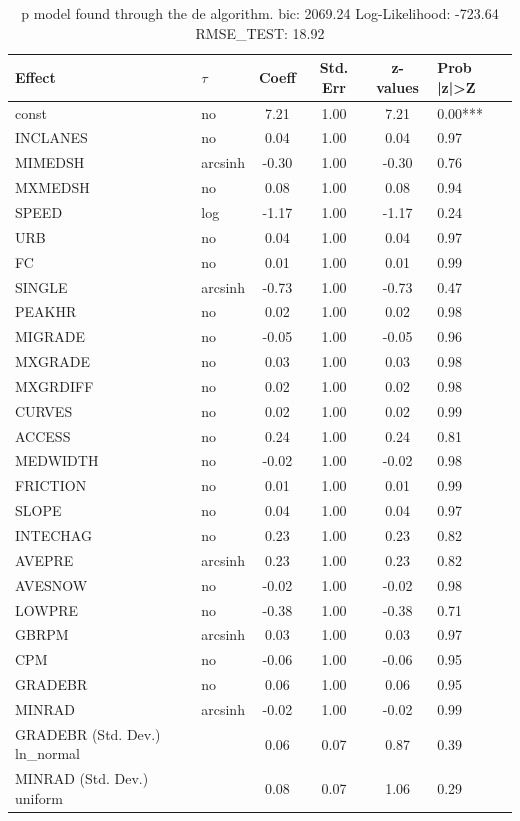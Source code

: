 \begin{table}
	\caption{p model found through the de algorithm. bic: 2069.24 Log-Likelihood: -723.64 RMSE_TEST: 18.92}
	\begin{center}
		\begin{tabular}{|l|l|c|c|c|l|}
			\hline
			Effect & $\tau$ & Coeff & Std. Err & z-values & Prob |z|>Z \\
			\hline
			const & no & 7.21 & 1.00 & 7.21 & 0.00*** \\
			\hline
			INCLANES & no & 0.04 & 1.00 & 0.04 & 0.97 \\
			\hline
			MIMEDSH & arcsinh & -0.30 & 1.00 & -0.30 & 0.76 \\
			\hline
			MXMEDSH & no & 0.08 & 1.00 & 0.08 & 0.94 \\
			\hline
			SPEED & log & -1.17 & 1.00 & -1.17 & 0.24 \\
			\hline
			URB & no & 0.04 & 1.00 & 0.04 & 0.97 \\
			\hline
			FC & no & 0.01 & 1.00 & 0.01 & 0.99 \\
			\hline
			SINGLE & arcsinh & -0.73 & 1.00 & -0.73 & 0.47 \\
			\hline
			PEAKHR & no & 0.02 & 1.00 & 0.02 & 0.98 \\
			\hline
			MIGRADE & no & -0.05 & 1.00 & -0.05 & 0.96 \\
			\hline
			MXGRADE & no & 0.03 & 1.00 & 0.03 & 0.98 \\
			\hline
			MXGRDIFF & no & 0.02 & 1.00 & 0.02 & 0.98 \\
			\hline
			CURVES & no & 0.02 & 1.00 & 0.02 & 0.99 \\
			\hline
			ACCESS & no & 0.24 & 1.00 & 0.24 & 0.81 \\
			\hline
			MEDWIDTH & no & -0.02 & 1.00 & -0.02 & 0.98 \\
			\hline
			FRICTION & no & 0.01 & 1.00 & 0.01 & 0.99 \\
			\hline
			SLOPE & no & 0.04 & 1.00 & 0.04 & 0.97 \\
			\hline
			INTECHAG & no & 0.23 & 1.00 & 0.23 & 0.82 \\
			\hline
			AVEPRE & arcsinh & 0.23 & 1.00 & 0.23 & 0.82 \\
			\hline
			AVESNOW & no & -0.02 & 1.00 & -0.02 & 0.98 \\
			\hline
			LOWPRE & no & -0.38 & 1.00 & -0.38 & 0.71 \\
			\hline
			GBRPM & arcsinh & 0.03 & 1.00 & 0.03 & 0.97 \\
			\hline
			CPM & no & -0.06 & 1.00 & -0.06 & 0.95 \\
			\hline
			GRADEBR & no & 0.06 & 1.00 & 0.06 & 0.95 \\
			\hline
			MINRAD & arcsinh & -0.02 & 1.00 & -0.02 & 0.99 \\
			\hline
			GRADEBR (Std. Dev.) ln_normal &  & 0.06 & 0.07 & 0.87 & 0.39 \\
			\hline
			MINRAD (Std. Dev.) uniform &  & 0.08 & 0.07 & 1.06 & 0.29 \\
			\hline
		\end{tabular}
	\end{center}
\end{table}